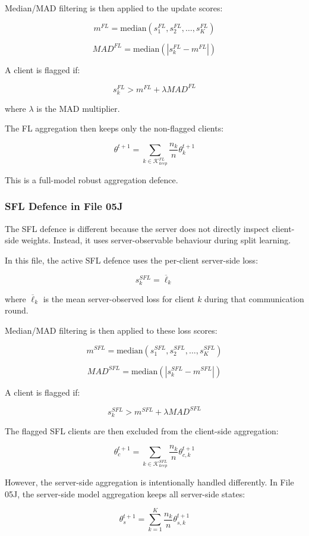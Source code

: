 Median/MAD filtering is then applied to the update scores:

\[
m^{FL}
=
\mathrm{median}(s_1^{FL}, s_2^{FL}, \dots, s_K^{FL})
\]

\[
MAD^{FL}
=
\mathrm{median}
\left(
|s_k^{FL} - m^{FL}|
\right)
\]

A client is flagged if:

\[
s_k^{FL}
>
m^{FL}
+
\lambda MAD^{FL}
\]

where $\lambda$ is the MAD multiplier.

The FL aggregation then keeps only the non-flagged clients:

\[
\theta^{t+1}
=
\sum_{k \in \mathcal{K}_{keep}^{FL}}
\frac{n_k}{n}
\theta_k^{t+1}
\]

This is a full-model robust aggregation defence.

\subsubsection*{SFL Defence in File 05J}

The SFL defence is different because the server does not directly inspect client-side weights. Instead, it uses server-observable behaviour during split learning.

In this file, the active SFL defence uses the per-client server-side loss:

\[
s_k^{SFL}
=
\overline{\ell}_k
\]

where $\overline{\ell}_k$ is the mean server-observed loss for client $k$ during that communication round.

Median/MAD filtering is then applied to these loss scores:

\[
m^{SFL}
=
\mathrm{median}(s_1^{SFL}, s_2^{SFL}, \dots, s_K^{SFL})
\]

\[
MAD^{SFL}
=
\mathrm{median}
\left(
|s_k^{SFL} - m^{SFL}|
\right)
\]

A client is flagged if:

\[
s_k^{SFL}
>
m^{SFL}
+
\lambda MAD^{SFL}
\]

The flagged SFL clients are then excluded from the client-side aggregation:

\[
\theta_c^{t+1}
=
\sum_{k \in \mathcal{K}_{keep}^{SFL}}
\frac{n_k}{n}
\theta_{c,k}^{t+1}
\]

However, the server-side aggregation is intentionally handled differently. In File 05J, the server-side model aggregation keeps all server-side states:

\[
\theta_s^{t+1}
=
\sum_{k=1}^{K}
\frac{n_k}{n}
\theta_{s,k}^{t+1}
\]

